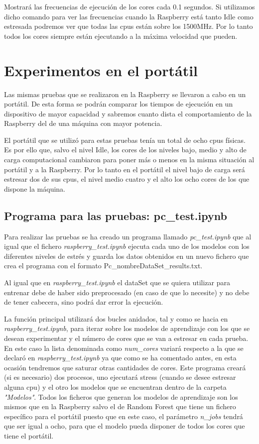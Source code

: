 \documentclass[a4paper, 12pt]{book}
\begin{document}
Mostrará las frecuencias de ejecución de los cores cada 0.1 segundos. Si utilizamos dicho comando para ver las frecuencias cuando la Raspberry está tanto Idle como estresada podremos ver que todas las cpus están sobre los 1500MHz. Por lo tanto todos los cores siempre están ejecutando a la máxima velocidad que pueden.

\section{Experimentos en el portátil}
\label{sec:experimentos_en_portatil}

Las mismas pruebas que se realizaron en la Raspberry se llevaron a cabo en un portátil. De esta forma se podrán comparar los tiempos de ejecución en un dispositivo de mayor capacidad y sabremos cuanto dista el comportamiento de la Raspberry del de una máquina con mayor potencia.

El portátil que se utilizó para estas pruebas tenía un total de ocho cpus físicas. Es por ello que, salvo el nivel Idle, los cores de los niveles bajo, medio y alto de carga computacional cambiaron para poner más o menos en la misma situación al portátil y a la Raspberry. Por lo tanto en el portátil el nivel bajo de carga será estresar dos de sus cpus, el nivel medio cuatro y el alto los ocho cores de los que dispone la máquina. 

\subsection{Programa para las pruebas: pc\_test.ipynb}
\label{subsec:programa_pruebas_pc}

Para realizar las pruebas se ha creado un programa llamado \textit{pc\_test.ipynb} que al igual que el fichero \textit{raspberry\_test.ipynb} ejecuta cada uno de los modelos con los diferentes niveles de estrés y guarda los datos obtenidos en un nuevo fichero que crea el programa con el formato Pc\_nombreDataSet\_results.txt.

Al igual que en \textit{raspberry\_test.ipynb} el dataSet que se quiera utilizar para entrenar debe de haber sido preprocesado (en caso de que lo necesite) y no debe de tener cabecera, sino podrá dar error la ejecución.

La función principal utilizará dos bucles anidados, tal y como se hacia en \textit{raspberry\_test.ipynb}, para iterar sobre los modelos de aprendizaje con los que se desean experimentar y el número de cores que se van a estresar en cada prueba. En este caso la lista denominada como \textit{num\_cores} variará respecto a la que se declaró en \textit{raspberry\_test.ipynb} ya que como se ha comentado antes, en esta ocasión tendremos que saturar otras cantidades de cores. Este programa creará (si es necesario) dos procesos, uno ejecutará stress (cuando se desee estresar alguna cpu) y el otro los modelos que se encuentran dentro de la carpeta \textit{"Modelos"}. Todos los ficheros que generan los modelos de aprendizaje son los mismos que en la Raspberry salvo el de Random Forest que tiene un fichero específico para el portátil puesto que en este caso, el parámetro \textit{n\_jobs} tendrá que ser igual a ocho, para que el modelo pueda disponer de todos los cores que tiene el portátil. 
\end{document}
